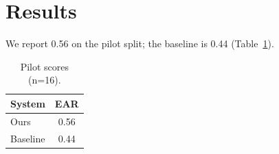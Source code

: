 \documentclass{article}
\begin{document}
\section{Results}
We report 0.56 on the pilot split; the baseline is 0.44 (Table~\ref{tab:pilot}).

\begin{table}[h]
\centering
\caption{Pilot scores (n=16).}
\label{tab:pilot}
\begin{tabular}{lc}
\toprule
System & EAR \\
\midrule
Ours & 0.56 \\
Baseline & 0.44 \\
\bottomrule
\end{tabular}
\end{table}



\end{document}
